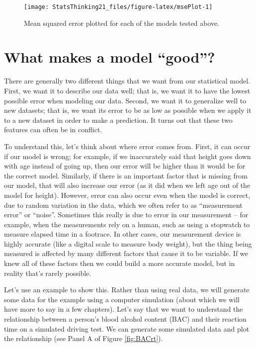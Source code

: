 \documentclass[12pt,]{book}
\theoremstyle{definition}
\theoremstyle{definition}
\theoremstyle{definition}
\theoremstyle{remark}
\begin{document}
\begin{figure}
\texttt{[image: StatsThinking21\_files/figure-latex/msePlot-1]} \caption{Mean squared error plotted for each of the models tested above.}\label{fig:msePlot}
\end{figure}

\hypertarget{what-makes-a-model-good}{%
\section{What makes a model ``good''?}\label{what-makes-a-model-good}}

There are generally two different things that we want from our statistical model. First, we want it to describe our data well; that is, we want it to have the lowest possible error when modeling our data. Second, we want it to generalize well to new datasets; that is, we want its error to be as low as possible when we apply it to a new dataset in order to make a prediction. It turns out that these two features can often be in conflict.

To understand this, let's think about where error comes from. First, it can occur if our model is wrong; for example, if we inaccurately said that height goes down with age instead of going up, then our error will be higher than it would be for the correct model. Similarly, if there is an important factor that is missing from our model, that will also increase our error (as it did when we left age out of the model for height). However, error can also occur even when the model is correct, due to random variation in the data, which we often refer to as ``measurement error'' or ``noise''. Sometimes this really is due to error in our measurement -- for example, when the measurements rely on a human, such as using a stopwatch to measure elapsed time in a footrace. In other cases, our measurement device is highly accurate (like a digital scale to measure body weight), but the thing being measured is affected by many different factors that cause it to be variable. If we knew all of these factors then we could build a more accurate model, but in reality that's rarely possible.

Let's use an example to show this. Rather than using real data, we will generate some data for the example using a computer simulation (about which we will have more to say in a few chapters). Let's say that we want to understand the relationship between a person's blood alcohol content (BAC) and their reaction time on a simulated driving test. We can generate some simulated data and plot the relationship (see Panel A of Figure \ref{fig:BACrt}).
\end{document}
